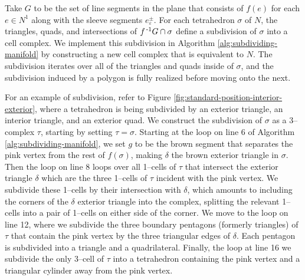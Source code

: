 Take $G$ to be the set of line segments in the plane that consists of $f(e)$ for each $e\in N^1$ along with the sleeve segments $e_\varepsilon^\pm$.
For each tetrahedron $\sigma$ of $N$, the triangles, quads, and intersections of $f^{\,\text{-}1} G\cap\sigma$ define a subdivision of $\sigma$ into a cell complex.
We implement this subdivision in Algorithm \ref{alg:subdividing-manifold} by constructing a new cell complex that is equivalent to $N$.
The subdivision iterates over all of the triangles and quads inside of $\sigma$, and the subdivision induced by a polygon is fully realized before moving onto the next.

For an example of subdivision, refer to Figure \ref{fig:standard-position-interior-exterior}, where a tetrahedron is being subdivided by an exterior triangle, an interior triangle, and an exterior quad.
We construct the subdivision of $\sigma$ as a 3--complex $\tau$, starting by setting $\tau = \sigma$.
Starting at the loop on line 6 of Algorithm \ref{alg:subdividing-manifold}, we set $g$ to be the brown segment that separates the pink vertex from the rest of $f(\sigma)$, making $\delta$ the brown exterior triangle in $\sigma$.
Then the loop on line 8 loops over all 1--cells of $\tau$ that intersect the exterior triangle $\delta$ which are the three 1--cells of $\tau$ incident with the pink vertex.
We subdivide these 1--cells by their intersection with $\delta$, which amounts to including the corners of the $\delta$ exterior triangle into the complex, splitting the relevant 1--cells into a pair of 1--cells on either side of the corner.
We move to the loop on line 12, where we subdivide the three boundary pentagons (formerly triangles) of $\tau$ that contain the pink vertex by the three triangular edges of $\delta$.
Each pentagon is subdivided into a triangle and a quadrilateral.
Finally, the loop at line 16 we subdivide the only 3--cell of $\tau$ into a tetrahedron containing the pink vertex and a triangular cylinder away from the pink vertex.

